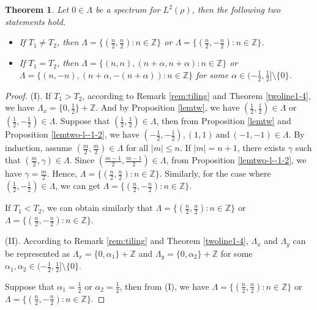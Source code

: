 \documentclass[12pt,a4paper,intlimits,sumlimits]{amsart}
\theoremstyle{plain}
\newtheorem{theorem}{Theorem}
\theoremstyle{definition}
\newcounter{rem}
\begin{document}
 \begin{theorem} \label{lemtw--t1}
Let $0\in\Lambda$  be a spectrum for $L^2(\rho)$,
then the following two statements hold. 
\begin{itemize}
\item[(I)]
 If $T_1 \neq T_2$, then $ \Lambda= \{(\frac{n}{2}, \frac{n}{2} ): n\in \mathbb{Z}\}$ or $ \Lambda= \{(\frac{n}{2}, -\frac{n}{2} ) : n\in \mathbb{Z}\}$.  
\item[(II)]
 If $T_1=T_2$, then  
$ \Lambda= \{(n, n ), (n+\alpha,n+\alpha): n\in \mathbb{Z}\}$ or $ \Lambda= \{(n, -n ), (n+\alpha, -(n+\alpha)): n\in \mathbb{Z}\}$ for some $\alpha\in(-\frac{1}{2}, \frac{1}{2}] \setminus\{0\}$.  
\end{itemize}
 \end{theorem}
\begin{proof}
(I).  If $T_1> T_2$,  according to Remark \ref{rem:tiling}  and  Theorem \ref{twoline1-4}, we have $\Lambda_x=\{0,  \frac{1}{2}\}+\mathbb{Z}$. And by   Proposition \ref{lemtw}, we have   $(\frac{1}{2}, \frac{1}{2})\in \Lambda$ or  $(\frac{1}{2}, -\frac{1}{2})\in \Lambda$. 
Suppose that $(\frac{1}{2}, \frac{1}{2})\in \Lambda$, then   from Proposition \ref{lemtw} and Proposition \ref{lemtwo-l--1-2}, we have $(-\frac{1}{2}, -\frac{1}{2}),  (1, 1) \ \text{and}\ (- 1, -1)  \in\Lambda$. By induction, assume $(\frac{m}{2}, \frac{m}{2})\in \Lambda$ for all $|m|\leq n$.  If  $|m|=n+1$, there exists  $\gamma$ such that $ (\frac{m}{2}, \gamma)\in\Lambda$. Since $ (\frac{m-1}{2}, \frac{m-1}{2})\in\Lambda$, from Proposition \ref{lemtwo-l--1-2}, we have $ \gamma=\frac{m}{2}$. Hence, $ \Lambda= \{(\frac{n}{2}, \frac{n}{2} ): n\in \mathbb{Z}\}$. Similarly, for the case where $(\frac{1}{2}, -\frac{1}{2})\in \Lambda$, we can get  $ \Lambda= \{(\frac{n}{2}, -\frac{n}{2} ) : n\in \mathbb{Z}\}$.

If  $T_1< T_2$, we can obtain  similarly  that 
 $ \Lambda= \{(\frac{n}{2}, \frac{n}{2} ): n\in \mathbb{Z}\}$ or $ \Lambda= \{(\frac{n}{2}, -\frac{n}{2} ) : n\in \mathbb{Z}\}$.
 
 (II). According to Remark \ref{rem:tiling} and  Theorem \ref{twoline1-4}, $\Lambda_x$ and $\Lambda_y $ can be represented  as  $\Lambda_x  =\{0, \alpha_1\}+\mathbb{Z}$  and $\Lambda_y  =\{0, \alpha_2\}+\mathbb{Z}$  for some $ \alpha_1, \alpha_2\in(-\frac{1}{2}, \frac{1}{2}]\setminus\{0\}$.

Suppose that $\alpha_1=\frac{1}{2}$ or $\alpha_2=\frac{1}{2}$, then from (I), we have $ \Lambda= \{(\frac{n}{2}, \frac{n}{2} ): n\in \mathbb{Z}\}$ or $ \Lambda= \{(\frac{n}{2}, -\frac{n}{2} ) : n\in \mathbb{Z}\}$. 


\end{proof}
\end{document}
